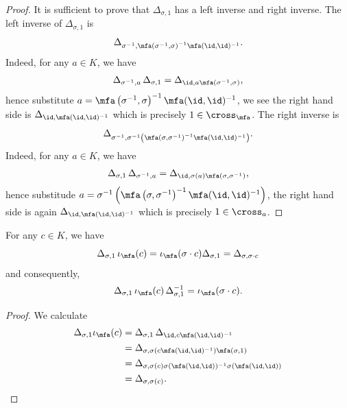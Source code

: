  \begin{proof}
   It is sufficient to prove that $\Delta_{\sigma, 1}$ has a left inverse and right inverse.
   The left inverse of $\Delta_{\sigma, 1}$ is
   \[
     \Delta_{\sigma^{-1}, \mfa\left(\sigma^{-1},\sigma\right)^{-1}\mfa(\id,\id)^{-1}}.
   \]
   Indeed, for any $a \in K$, we have
   \[
     \Delta_{\sigma^{-1}, a}\,\Delta_{\sigma, 1} = \Delta_{\id, a\mfa\left(\sigma^{-1},\sigma\right)},
   \]
   hence substitute $a = \mfa\left(\sigma^{-1},\sigma\right)^{-1}\mfa(\id,\id)^{-1}$, we see the right hand side is $\Delta_{
     \id,\mfa(\id,\id)^{-1}}$ which is precisely $1 \in \cross_{\mfa}$. The right inverse is
   \[
     \Delta_{\sigma^{-1}, \sigma^{-1}\left(\mfa\left(\sigma,\sigma^{-1}\right)^{-1} \mfa(\id,\id)^{-1}\right)}.
   \]
   Indeed, for any $a \in K$, we have
   \[
     \Delta_{\sigma,1}\,\Delta_{\sigma^{-1},a} = \Delta_{\id, \sigma(a)\mfa\left(\sigma,\sigma^{-1}\right)},
   \]
   hence substitude $a = \sigma^{-1}\left(\mfa\left(\sigma,\sigma^{-1}\right)^{-1}\mfa(\id,\id)^{-1}\right)$, the right hand side is again $\Delta_{\id,\mfa(\id,\id)^{-1}}$ which is precisely $1 \in \cross_{a}$.
 \end{proof}
 \begin{lemma}\label{lem:cross-product-basis-conj}
   For any $c \in K$, we have
   \[
     \Delta_{\sigma,1}\,\iota_{\mfa}(c) = \iota_{\mfa}(\sigma\cdot c)\Delta_{\sigma, 1} = \Delta_{\sigma,\sigma\cdot c}
   \]
   and consequently,
   \[
     \Delta_{\sigma,1}\,\iota_{\mfa}(c)\,\Delta_{\sigma, 1}^{-1} = \iota_{\mfa}(\sigma \cdot c).
   \]
   \leanok
 \end{lemma}

 \begin{proof}
   We calculate
   \[
     \begin{aligned}
       \Delta_{\sigma,1}\iota_{\mfa}(c)
       &= \Delta_{\sigma,1}\,\Delta_{\id,c\mfa(\id,\id)^{-1}}\\
       &= \Delta_{\sigma, \sigma(c\mfa(\id,\id)^{-1})\mfa(\sigma,1)}\\
       &= \Delta_{\sigma,\sigma(c)\sigma(\mfa(\id,\id))^{-1}\sigma(\mfa(\id,\id))}\\
       &= \Delta_{\sigma,\sigma(c)}.
     \end{aligned}
   \]
 \end{proof}


